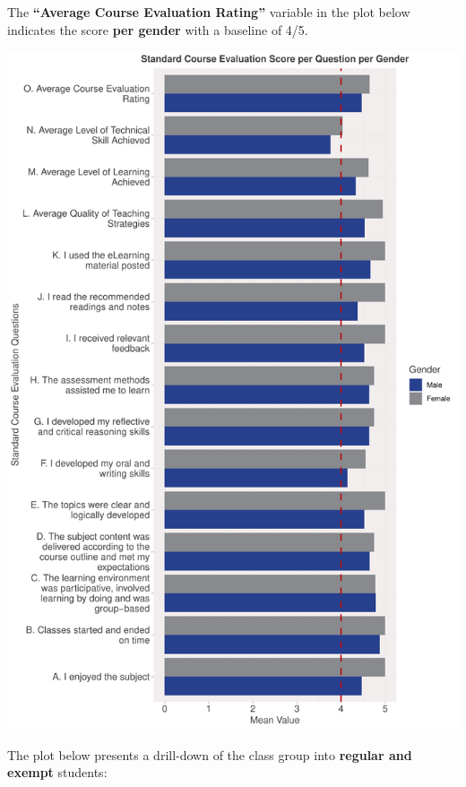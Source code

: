 \documentclass[
]{article}
\begin{document}
\newpage

The \textbf{``Average Course Evaluation Rating''} variable in the plot
below indicates the score \textbf{per gender} with a baseline of 4/5.

\includegraphics{10.b.BBT4206-End-SemesterCourseEvaluation-20230821-20231128-BI2-BBIT4-2_files/figure-latex/VisualizationsForCourseEvaluationResultsperGender-1.pdf}

\newpage

The plot below presents a drill-down of the class group into
\textbf{regular and exempt} students:
\end{document}
